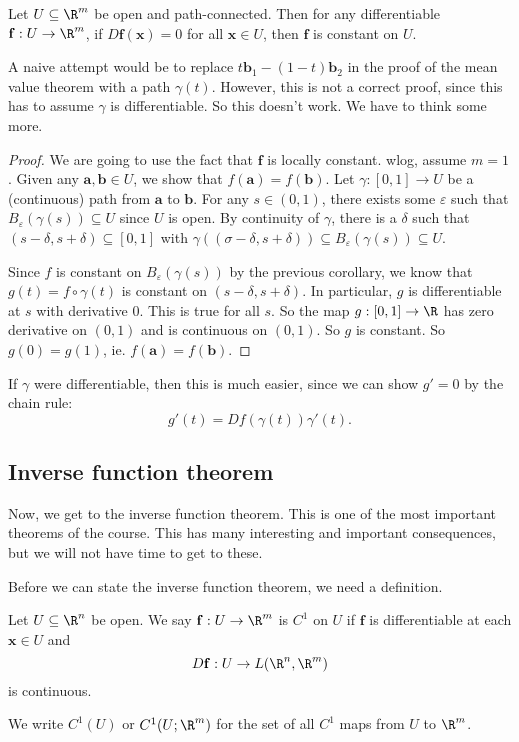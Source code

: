 \documentclass[a4paper]{article}
\begin{document}
\begin{thm}
  Let $U\subseteq \R^m$ be open and path-connected. Then for any differentiable $\mathbf{f}: U \to \R^m$, if $D\mathbf{f}(\mathbf{x}) = 0$ for all $\mathbf{x} \in U$, then $\mathbf{f}$ is constant on $U$.
\end{thm}
A naive attempt would be to replace $t\mathbf{b}_1 - (1 - t)\mathbf{b}_2$ in the proof of the mean value theorem with a path $\gamma(t)$. However, this is not a correct proof, since this has to assume $\gamma$ is differentiable. So this doesn't work. We have to think some more.

\begin{proof}
  We are going to use the fact that $\mathbf{f}$ is locally constant. wlog, assume $m = 1$. Given any $\mathbf{a}, \mathbf{b} \in U$, we show that $f(\mathbf{a}) = f(\mathbf{b})$. Let $\gamma: [0, 1] \to U$ be a (continuous) path from $\mathbf{a}$ to $\mathbf{b}$. For any $s \in (0, 1)$, there exists some $\varepsilon$ such that $B_\varepsilon(\gamma(s)) \subseteq U$ since $U$ is open. By continuity of $\gamma$, there is a $\delta$ such that $(s - \delta, s + \delta) \subseteq [0, 1]$ with $\gamma((\sigma - \delta, s + \delta)) \subseteq B_\varepsilon(\gamma(s)) \subseteq U$.

  Since $f$ is constant on $B_\varepsilon(\gamma(s))$ by the previous corollary, we know that $g(t) = f \circ \gamma (t)$ is constant on $(s - \delta, s + \delta)$. In particular, $g$ is differentiable at $s$ with derivative $0$. This is true for all $s$. So the map $g: [0, 1] \to \R$ has zero derivative on $(0, 1)$ and is continuous on $(0, 1)$. So $g$ is constant. So $g(0) = g(1)$, ie. $f(\mathbf{a}) = f(\mathbf{b})$.
\end{proof}
If $\gamma$ were differentiable, then this is much easier, since we can show $g' = 0$ by the chain rule:
\[
  g'(t) = D f(\gamma(t)) \gamma'(t).
\]
\subsection{Inverse function theorem}
Now, we get to the inverse function theorem. This is one of the most important theorems of the course. This has many interesting and important consequences, but we will not have time to get to these.

Before we can state the inverse function theorem, we need a definition.
\begin{defi}[$C^1$ function]
  Let $U \subseteq \R^n$ be open. We say $\mathbf{f}: U \to \R^m$ is $C^1$ on $U$ if $\mathbf{f}$ is differentiable at each $\mathbf{x} \in U$ and
  \[
    D\mathbf{f}: U \to L(\R^n, \R^m)
  \]
  is continuous.

  We write $C^1(U)$ or $C^1(U; \R^m)$ for the set of all $C^1$ maps from $U$ to $\R^m$.
\end{defi}
\end{document}
